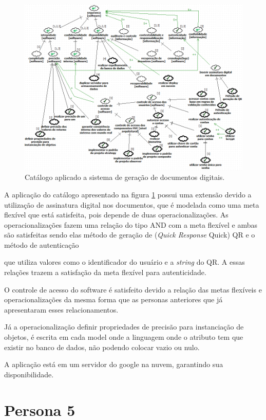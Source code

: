 \begin{figure}[h!]
	\centering
	\includegraphics[keepaspectratio=true,scale=0.7]{figuras/catalogoPersona4.PNG}
	\caption{Catálogo aplicado a sistema de geração de documentos digitais.}
	\label{catalogoPersona4}
\end{figure}

A aplicação do catálogo apresentado na figura \ref{catalogoPersona4} possui uma extensão devido a utilização de assinatura digital nos documentos, que é modelada como uma meta flexível que está satisfeita, pois depende de duas operacionalizações. As operacionalizações fazem uma relação do tipo AND com a meta flexível e ambas são satisfeitas sendo elas método de geração de (\textit{Quick Response} Quick) QR e o  método de autenticação

que utiliza valores como o identificador do usuário e a \textit{string} do QR. A essas relações trazem a satisfação da meta flexível para autenticidade. 

O controle de acesso do software é satisfeito devido a relação das metas flexíveis e operacionalizações da mesma forma que as personas anteriores que já apresentaram esses relacionamentos.  

Já a operacionalização definir propriedades de precisão para instanciação de objetos, é escrita em cada model onde a linguagem onde o atributo tem que existir no banco de dados, não podendo colocar vazio ou nulo. 

A aplicação está em um servidor do google na nuvem, garantindo sua disponibilidade.  


\section{Persona 5}
\label{subsec:persona5}

